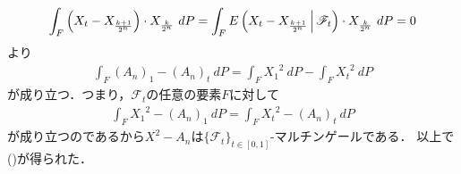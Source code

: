 \begin{sketch}
\begin{description}
\begin{align}
					\int_{F} \left( X_{t} - X_{\frac{k+1}{2^{n}}} \right) \cdot X_{\frac{k}{2^{n}}}\ dP
					= \int_{F} E\left( X_{t} - X_{\frac{k+1}{2^{n}}} \, \middle|\, \mathscr{F}_{t} \right) \cdot X_{\frac{k}{2^{n}}}\ dP
					= 0
				\end{align}
				より
				\begin{align}
					\int_{F} (A_{n})_{1} - (A_{n})_{t}\ dP = \int_{F} {X_{1}}^{2}\ dP - \int_{F} {X_{t}}^{2}\ dP
				\end{align}
				が成り立つ．つまり，$\mathscr{F}_{t}$の任意の要素$F$に対して
				\begin{align}
					\int_{F} {X_{1}}^{2} - (A_{n})_{1}\ dP = \int_{F} {X_{t}}^{2} - (A_{n})_{t}\ dP
				\end{align}
				が成り立つのであるから$X^{2} - A_{n}$は$\{\mathscr{F}_{t}\}_{t \in [0,1]}$-マルチンゲールである．
				以上で()が得られた．
				

\end{description}
\end{sketch}
